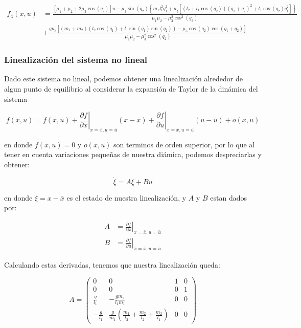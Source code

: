 \documentclass{article}
\begin{document}
\[
\begin{align}
f_4(x, u) &= \frac{ \left[ \mu_1 + \mu_2 + 2 \mu_3 \cos{(q_2)} \right]u - \mu_3 \sin{(q_2)} \left\{ m_1 l_1^2 \dot{q}_1^2 + \mu_5 \left[ \left( l_2 + l_1 \cos{(q_2)} \right) \left( \dot{q}_1 + \dot{q}_2 \right)^2 + l_1 \cos{(q_2)} \dot{q}_1^2 \right] \right\}}{\mu_1 \mu_2 - \mu_3^2 \cos^2{(q_2)}} \\
&+ \frac{g \mu_3 \left[ \left( m_1 + m_2 \right)\left( l_2 \cos{(q_1)} + l_1 \sin{(q_1)} \sin{(q_2)} \right) - \mu_5 \cos{(q_2)} \cos{(q_1 + q_2)} \right]}{\mu_1 \mu_2 - \mu_3^2 \cos^2{(q_2)}}
\end{align}
\]

    \subsubsection*{Linealización del sistema no
lineal}\label{linealizaciuxf3n-del-sistema-no-lineal}

    Dado este sistema no lineal, podemos obtener una linealización alrededor
de algun punto de equilibrio al considerar la expansión de Taylor de la
dinámica del sistema

\[
f(x, u) = f(\bar{x}, \bar{u}) + \left. \frac{\partial f}{\partial x} \right|_{x=\bar{x}, u=\bar{u}} (x - \bar{x}) + \left. \frac{\partial f}{\partial u} \right|_{x=\bar{x}, u=\bar{u}} (u - \bar{u}) + o(x, u)
\]

en donde \(f(\bar{x}, \bar{u}) = 0\) y \(o(x, u)\) son terminos de orden
superior, por lo que al tener en cuenta variaciones pequeñas de nuestra
diámica, podemos despreciarlas y obtener:

\[
\dot{\xi} = A \xi + B u
\]

en donde \(\xi = x - \bar{x}\) es el estado de nuestra linealización, y
\(A\) y \(B\) estan dados por:

\[
\begin{align}
A &= \left. \frac{\partial f}{\partial x} \right|_{x=\bar{x}, u=\bar{u}} \\
B &= \left. \frac{\partial f}{\partial u} \right|_{x=\bar{x}, u=\bar{u}}
\end{align}
\]

Calculando estas derivadas, tenemos que nuestra linealización queda:

\[
A =
\begin{pmatrix}
0 & 0 & 1 & 0 \\
0 & 0 & 0 & 1 \\
\frac{g}{l_1} & -\frac{g m_2}{l_1 m_1} & 0 & 0 \\
-\frac{g}{l_1} & \frac{g}{m_1} \left( \frac{m_1}{l_2} + \frac{m_2}{l_2} + \frac{m_2}{l_1} \right) & 0 & 0
\end{pmatrix}
\]
\end{document}

